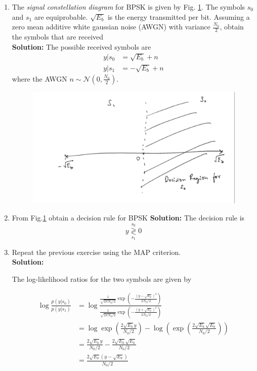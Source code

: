 \documentclass[12pt]{book}
\newcommand{\solution}{\noindent \textbf{Solution: }}
\providecommand{\dec}[2]{\ensuremath{\overset{#1}{\underset{#2}{\gtrless}}}}
\providecommand{\gauss}[2]{\mathcal{N}\ensuremath{\left(#1,#2\right)}}
\begin{document}
\begin{enumerate}
\item
The {\em signal constellation diagram} for BPSK is given by Fig. \ref{fig:6.1}.  The symbols $s_0$ and $s_1$ are equiprobable.  $\sqrt{E_b}$ is the energy transmitted per bit. Assuming a zero mean additive white gaussian noise (AWGN) with variance $\frac{N_0}{2}$,
obtain the symbols that are received\\
\solution The possible received symbols are
\begin{align}
y|s_0 &= \sqrt{E_b} + n
\\
y|s_1 &= -\sqrt{E_b} + n
\end{align}
%
where the AWGN $n \sim \gauss{0}{\frac{N_0}{2}}$.
\begin{figure}[H]
\centering
\includegraphics[width=\columnwidth]{./figs/6/1.pdf}
\caption{}
\label{fig:6.1}
\end{figure}
\item
\label{prob:bpsk_decision}
From Fig.\ref{fig:6.1} obtain a decision rule for BPSK
\solution The decision rule is
\begin{equation}
y \dec{s_0}{s_1} 0
\end{equation}
\item
Repeat the previous exercise using the MAP criterion.\\
\solution

The log-likelihood ratios for the two symbols are given by

\begin{align}
\log\frac{p(y|s_0)}{p(y|s_1)} &= \log\frac{\frac{1}{\sqrt{2\pi N_0/2}} \exp\left(-\frac{(y-\sqrt{E_b})^2}{2N_0/2}\right)}{\frac{1}{\sqrt{2\pi N_0/2}} \exp\left(-\frac{(y+\sqrt{E_b})^2}{2N_0/2}\right)} \\
&= \log\exp\left(\frac{2\sqrt{E_b}y}{N_0/2}\right) - \log\left(\exp\left(\frac{2\sqrt{E_b} \sqrt{E_b}}{N_0/2}\right)\right) \\
&= \frac{2\sqrt{E_b}y}{N_0/2} - \frac{2\sqrt{E_b} \sqrt{E_b}}{N_0/2} \\
&= \frac{2\sqrt{E_b}(y-\sqrt{E_b})}{N_0/2}
\end{align}


\end{enumerate}
\end{document}
